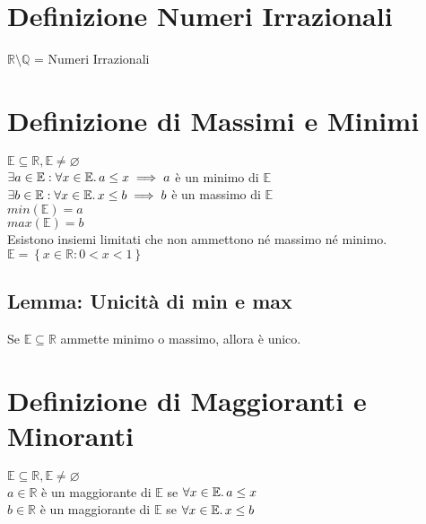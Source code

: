 \documentclass[a4paper, twoside, italian, 11pt]{book}
\newcommand{\braces}[1] {\left\{#1\right\}}
\newcommand{\Q}{\mathbb{Q}}
\newcommand{\R}{\mathbb{R}}
\newcommand{\E}{\mathbb{E}}
\let\emptyset\varnothing
\begin{document}
\section{Definizione Numeri Irrazionali}

\noindent
$\R \setminus \Q$ = Numeri Irrazionali



\section{Definizione di Massimi e Minimi}

$\E \subseteq \R, \E \neq \emptyset$ \\

$\exists a \in \E : \forall x \in \E \ldotp a \leq x \implies a$ è un minimo di $\E$ \\

$\exists b \in \E : \forall x \in \E \ldotp x \leq b \implies b$ è un massimo di $\E$ \\

$min(\E) = a$ \\
\indent
$max(\E) = b$ \\

\noindent
Esistono insiemi limitati che non ammettono né massimo né minimo. \\

$\E = \braces{x \in \R : 0 < x < 1}$


\subsection{Lemma: Unicità di min e max}

Se $\E \subseteq \R$ ammette minimo o massimo, allora è unico.




\section{Definizione di Maggioranti e Minoranti}

$\E \subseteq \R, \E \neq \emptyset$ \\

$a \in \R$ è un maggiorante di $\E$ se $\forall x \in \E \ldotp a \leq x$ \\

$b \in \R$ è un maggiorante di $\E$ se $\forall x \in \E \ldotp x \leq b$ \\
\end{document}
